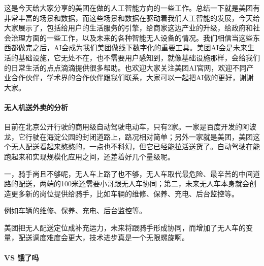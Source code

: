 \documentclass[letterpaper,10pt,english]{sphinxmanual}
\begin{document}
这是今天给大家分享的美团在做的人工智能方向的一些工作。总结一下就是美团有非常丰富的场景和数据，而这些场景和数据在驱动着我们人工智能的发展，今天给大家展示了，包括给用户的生活服务的引擎，给商家这边产业的升级，给政府和社会治理方面的一些工作，以及未来的各种智能无人设备的情况。我们相信当这些东西都做完之后，AI会成为我们美团做线下数字化的重要工具。美团AI会是未来生活的基础设施，它无处不在，也不需要用户感知到，就像基础设施那样，会给我们的日常生活的点点滴滴提供很多帮助。也欢迎大家关注美团AI官网，欢迎不同产业合作伙伴，学术界的合作伙伴跟我们联系，大家可以一起把AI做的更好，谢谢大家。


\paragraph{无人机送外卖的分析}
\label{\detokenize{chapter_AI_company/meituan:id7}}
%
\begin{footnote}[1032]\sphinxAtStartFootnote
{}
%
\end{footnote}

目前在北京公开行驶的商用级自动驾驶电动车，只有2家。一家是百度开发的阿波龙，它行驶在海淀公园的封闭道路上，路况相对简单；另外一家就是美团，美团这个无人配送看起来憨憨的，一点也不科幻，但它已经能拉活送货了。自动驾驶在能跑起来和实现规模化应用之间，还差着好几个量级呢。

一，骑手尚且不够呢，无人车上路了也不够，无人车取代最危险、最辛苦的中间道路的配送，两端的100米还需要小哥跟无人车协同；第二，未来无人车本身就会创造更多新的岗位提供给骑手，比如车辆的维修、保养、充电、后台监控等。

例如车辆的维修、保养、充电、后台监控等。

美团把无人配送定位成补充运力，未来将跟骑手形成协同，而增加了无人车的变量，配送调度难度会更大，技术进步真是一个无限螺旋啊。%
\begin{footnote}[1033]\sphinxAtStartFootnote
{}
%
\end{footnote}


\paragraph{VS 饿了吗}
\label{\detokenize{chapter_AI_company/meituan:vs}}
\end{document}
